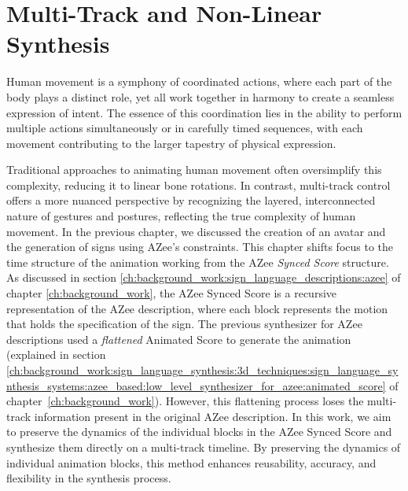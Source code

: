 \documentclass[../../main.tex]{subfiles}
\begin{document}
\chapter{Multi-Track and Non-Linear Synthesis}
\label{ch:multi_track}

Human movement is a symphony of coordinated actions, where each part of the body plays a distinct role, yet all work together in harmony to create a seamless expression of intent. The essence of this coordination lies in the ability to perform multiple actions simultaneously or in carefully timed sequences, with each movement contributing to the larger tapestry of physical expression.

Traditional approaches to animating human movement often oversimplify this complexity, reducing it to linear bone rotations. In contrast, multi-track control offers a more nuanced perspective by recognizing the layered, interconnected nature of gestures and postures, reflecting the true complexity of human movement. In the previous chapter, we discussed the creation of an avatar and the generation of signs using AZee's constraints. This chapter shifts focus to the time structure of the animation working from the AZee \emph{Synced Score} structure. As discussed in section \ref{ch:background_work:sign_language_descriptions:azee} of chapter \ref{ch:background_work}, the AZee Synced Score is a recursive representation of the AZee description, where each block represents the motion that holds the specification of the sign. The previous synthesizer for AZee descriptions used a \emph{flattened} Animated Score to generate the animation (explained in section \ref{ch:background_work:sign_language_synthesis:3d_techniques:sign_language_synthesis_systems:azee_based:low_level_synthesizer_for_azee:animated_score} of chapter~\ref{ch:background_work}). However, this flattening process loses the multi-track information present in the original AZee description. In this work, we aim to preserve the dynamics of the individual blocks in the AZee Synced Score and synthesize them directly on a multi-track timeline. By preserving the dynamics of individual animation blocks, this method enhances reusability, accuracy, and flexibility in the synthesis process.
\end{document}
